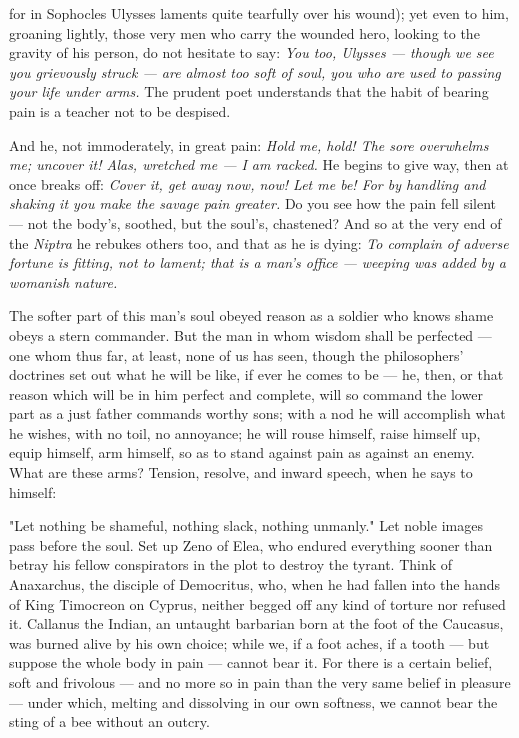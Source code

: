 for in Sophocles Ulysses laments quite tearfully over his wound); yet even to him, groaning lightly, those very men who carry the wounded hero, looking to the gravity of his person, do not hesitate to say: \textit{You too, Ulysses — though we see you grievously struck — are almost too soft of soul, you who are used to passing your life under arms.} The prudent poet understands that the habit of bearing pain is a teacher not to be despised.

 And he, not immoderately, in great pain: \textit{Hold me, hold! The sore overwhelms me; uncover it! Alas, wretched me — I am racked.} He begins to give way, then at once breaks off: \textit{Cover it, get away now, now! Let me be! For by handling and shaking it you make the savage pain greater.} Do you see how the pain fell silent — not the body's, soothed, but the soul's, chastened? And so at the very end of the \textit{Niptra} he rebukes others too, and that as he is dying: \textit{To complain of adverse fortune is fitting, not to lament; that is a man's office — weeping was added by a womanish nature.}

 The softer part of this man's soul obeyed reason as a soldier who knows shame obeys a stern commander. But the man in whom wisdom shall be perfected — one whom thus far, at least, none of us has seen, though the philosophers' doctrines set out what he will be like, if ever he comes to be — he, then, or that reason which will be in him perfect and complete, will so command the lower part as a just father commands worthy sons; with a nod he will accomplish what he wishes, with no toil, no annoyance; he will rouse himself, raise himself up, equip himself, arm himself, so as to stand against pain as against an enemy. What are these arms? Tension, resolve, and inward speech, when he says to himself:

 "Let nothing be shameful, nothing slack, nothing unmanly." Let noble images pass before the soul. Set up Zeno of Elea, who endured everything sooner than betray his fellow conspirators in the plot to destroy the tyrant. Think of Anaxarchus, the disciple of Democritus, who, when he had fallen into the hands of King Timocreon on Cyprus, neither begged off any kind of torture nor refused it. Callanus the Indian, an untaught barbarian born at the foot of the Caucasus, was burned alive by his own choice; while we, if a foot aches, if a tooth — but suppose the whole body in pain — cannot bear it. For there is a certain belief, soft and frivolous — and no more so in pain than the very same belief in pleasure — under which, melting and dissolving in our own softness, we cannot bear the sting of a bee without an outcry.


